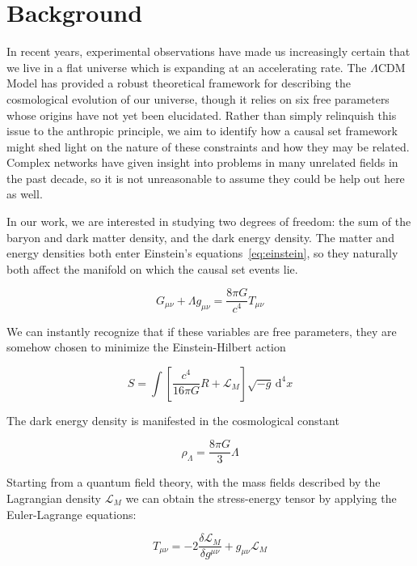 \documentclass[preprint,notitlepage,amsmath,amssymb,floatfix]{revtex4-1}
\begin{document}
\section{Background}
In recent years, experimental observations have made us increasingly certain that we live in a flat universe which is expanding at an accelerating rate.  
The $\Lambda$CDM Model has provided a robust theoretical framework for describing the cosmological evolution of our universe, though it relies on six free parameters whose origins have not yet been elucidated.
Rather than simply relinquish this issue to the anthropic principle, we aim to identify how a causal set framework might shed light on the nature of these constraints and how they may be related.
Complex networks have given insight into problems in many unrelated fields in the past decade, so it is not unreasonable to assume they could be help out here as well. \par
In our work, we are interested in studying two degrees of freedom:  the sum of the baryon and dark matter density, and the dark energy density.  
The matter and energy densities both enter Einstein's equations~\eqref{eq:einstein}, so they naturally both affect the manifold on which the causal set events lie.

\begin{equation}
\label{eq:einstein}
G_{\mu\nu} + \Lambda g_{\mu\nu} = \frac{8\pi G}{c^4}T_{\mu\nu}
\end{equation}

\noindent We can instantly recognize that if these variables are free parameters, they are somehow chosen to minimize the Einstein-Hilbert action

\begin{equation}
\label{eq:EH_Action}
S = \int\!\left[\frac{c^4}{16\pi G}R+\mathcal{L}_M\right]\sqrt{-g}\, \mathrm d^4x
\end{equation}

\noindent The dark energy density is manifested in the cosmological constant

\begin{equation}
\label{eq:dark_energy_density}
\rho_\Lambda = \frac{8\pi G}{3}\Lambda
\end{equation}

\noindent Starting from a quantum field theory, with the mass fields described by the Lagrangian density $\mathcal{L}_M$ we can obtain the stress-energy tensor by applying the Euler-Lagrange equations:

\begin{equation}
\label{eq:EL_stress_energy}
T_{\mu\nu} = -2\frac{\delta\mathcal{L}_M}{\delta g^{\mu\nu}} + g_{\mu\nu}\mathcal{L}_M
\end{equation}
\end{document}
